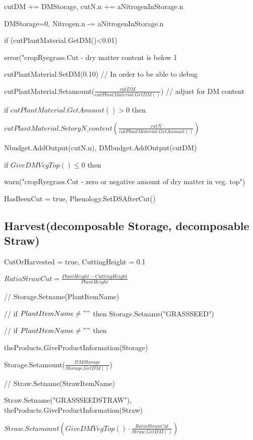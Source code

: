 \documentclass[%
]{scrartcl}
\begin{document}
 \quad      cutDM += DMStorage,
      cutN.n += aNitrogenInStorage.n

 \quad      DMStorage=0,
      Nitrogen.n -=  aNitrogenInStorage.n


   if (cutPlantMaterial.GetDM()<0.01)
   
  \quad     error("cropRyegrass.Cut - dry matter content is below 1 %

   \quad    cutPlantMaterial.SetDM(0.10) //  In order to be able to debug
  



   cutPlantMaterial.Setamount($\tfrac{cutDM}{cutPlantMaterial.GetDM()}$)     // adjust for DM content

   if $cutPlantMaterial.GetAmount()>0$ then

\quad 	  $ cutPlantMaterial.SetorgN\_content(\tfrac{cutN}{cutPlantMaterial.GetAmount()})$
 
  Nbudget.AddOutput(cutN.n),     
   DMbudget.AddOutput(cutDM)

   if $GiveDMVegTop() \le 0$ then

    \quad  warn("cropRyegrass.Cut - zero or negative amount of dry matter in veg. top")

   HasBeenCut = true,
   Phenology.SetDSAfterCut()

\subsection{Harvest(decomposable Storage, decomposable Straw)}

   CutOrHarvested = true,
   CuttingHeight = 0.1

   $RatioStrawCut = \tfrac{PlantHeight-CuttingHeight}{PlantHeight}$

   //    Storage.Setname(PlantItemName)

   //    if $PlantItemName \ne ""$ then
      Storage.Setname("GRASSSEED")
  
 //    if $PlantItemName \ne ""$ then
     
   	\quad   theProducts.GiveProductInformation(Storage)

   	\quad   Storage.Setamount($\tfrac{DMStorage}{Storage.GetDM()}$)
    

   //    Straw.Setname(StrawItemName)

      Straw.Setname("GRASSSEEDSTRAW"),
   theProducts.GiveProductInformation(Straw)

$   Straw.Setamount(GiveDMVegTop() \cdot \tfrac{RatioStrawCut}{Straw.GetDM()})$
  
\end{document}
